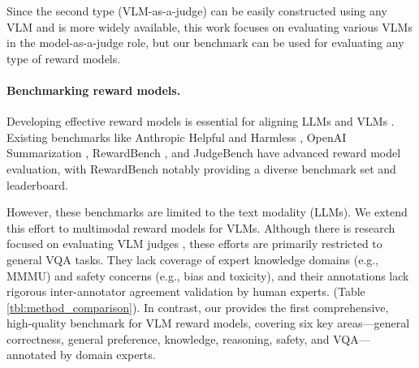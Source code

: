 Since the second type (VLM-as-a-judge) can be easily constructed using any VLM and is more widely available, this work focuses on evaluating various VLMs in the model-as-a-judge role, but our benchmark can be used for evaluating any type of reward models.


\paragraph{Benchmarking reward models.}
Developing effective reward models is essential for aligning LLMs and VLMs \citep{instructgpt, llama3}. Existing benchmarks like Anthropic Helpful and Harmless \citep{bai2022training}, OpenAI Summarization \citep{stiennon2020learning}, RewardBench \citep{lambert2024rewardbench}, and JudgeBench \citep{tan2024judgebench} have advanced reward model evaluation, with RewardBench notably providing a diverse benchmark set and leaderboard.

However, these benchmarks are limited to the text modality (LLMs). We extend this effort to multimodal reward models for VLMs. Although there is research focused on evaluating VLM judges \citep{lee2024prometheusvision, xiong2024llava, chen2024mllm, li2024vlrewardbench}, these efforts are primarily restricted to general VQA tasks. They lack coverage of expert knowledge domains (e.g., MMMU) and safety concerns (e.g., bias and toxicity), and their annotations lack rigorous inter-annotator agreement validation by human experts. (Table \ref{tbl:method_comparison}). In contrast, our \methodname provides the first comprehensive, high-quality benchmark for VLM reward models, covering six key areas---general correctness, general preference, knowledge, reasoning, safety, and VQA---annotated by domain experts.
